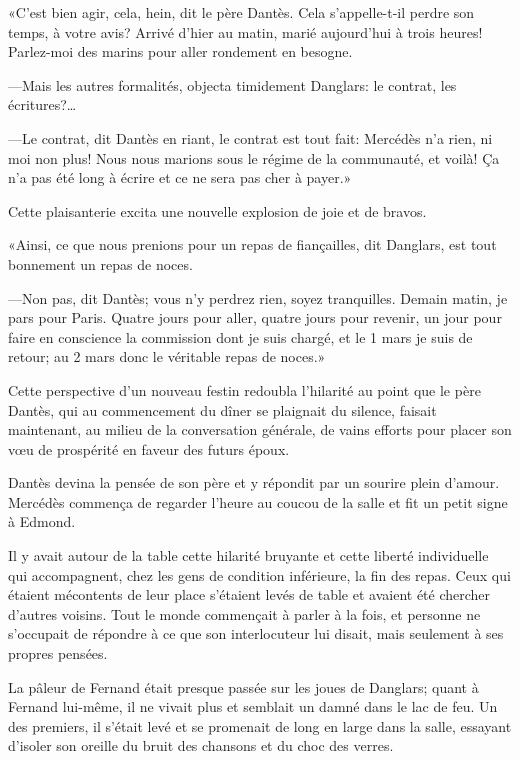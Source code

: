 «C'est bien agir, cela, hein, dit le père Dantès. Cela s'appelle-t-il perdre son temps, à votre avis? Arrivé d'hier au matin, marié aujourd'hui à trois heures! Parlez-moi des marins pour aller rondement en besogne.

—Mais les autres formalités, objecta timidement Danglars: le contrat, les écritures?\dots

—Le contrat, dit Dantès en riant, le contrat est tout fait: Mercédès n'a rien, ni moi non plus! Nous nous marions sous le régime de la communauté, et voilà! Ça n'a pas été long à écrire et ce ne sera pas cher à payer.»

Cette plaisanterie excita une nouvelle explosion de joie et de bravos.

«Ainsi, ce que nous prenions pour un repas de fiançailles, dit Danglars, est tout bonnement un repas de noces.

—Non pas, dit Dantès; vous n'y perdrez rien, soyez tranquilles. Demain matin, je pars pour Paris. Quatre jours pour aller, quatre jours pour revenir, un jour pour faire en conscience la commission dont je suis chargé, et le 1\ier{} mars je suis de retour; au 2 mars donc le véritable repas de noces.»

Cette perspective d'un nouveau festin redoubla l'hilarité au point que le père Dantès, qui au commencement du dîner se plaignait du silence, faisait maintenant, au milieu de la conversation générale, de vains efforts pour placer son vœu de prospérité en faveur des futurs époux.

Dantès devina la pensée de son père et y répondit par un sourire plein d'amour. Mercédès commença de regarder l'heure au coucou de la salle et fit un petit signe à Edmond.

Il y avait autour de la table cette hilarité bruyante et cette liberté individuelle qui accompagnent, chez les gens de condition inférieure, la fin des repas. Ceux qui étaient mécontents de leur place s'étaient levés de table et avaient été chercher d'autres voisins. Tout le monde commençait à parler à la fois, et personne ne s'occupait de répondre à ce que son interlocuteur lui disait, mais seulement à ses propres pensées.

La pâleur de Fernand était presque passée sur les joues de Danglars; quant à Fernand lui-même, il ne vivait plus et semblait un damné dans le lac de feu. Un des premiers, il s'était levé et se promenait de long en large dans la salle, essayant d'isoler son oreille du bruit des chansons et du choc des verres.

